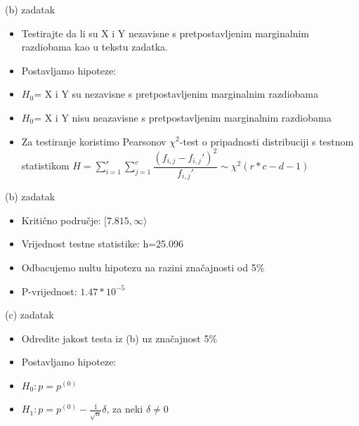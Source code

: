 \documentclass{beamer}
\begin{document}
\begin{frame}{(b) zadatak}
\begin{itemize}
\item Testirajte da li su X i Y nezavisne s pretpostavljenim marginalnim razdiobama kao u
tekstu zadatka.
\item Postavljamo hipoteze:\\
\item $ H_{0} $= X i Y su nezavisne s pretpostavljenim marginalnim razdiobama\\
\item $ H_{0} $= X i Y nisu neazavisne s pretpostavljenim marginalnim razdiobama\\
\item Za testiranje koristimo Pearsonov $\chi^2$-test o pripadnosti distribuciji s testnom statistikom 
$H=\sum_{i=1}^{r} \sum_{j=1}^{c} \dfrac{(f_{i,j}-f_{i,j}')^2}{f_{i,j}'} \sim \chi^2(r*c-d-1)$
\end{itemize}
\end{frame}

\begin{frame}{(b) zadatak}
\begin{itemize}
\item Kritično područje: $[7.815,\infty\rangle$
\item Vrijednost testne statistike: h=25.096 
\item Odbacujemo nultu hipotezu na razini značajnosti od 5\% 
\item P-vrijednost: $1.47*10^{-5}$ 
\end{itemize}
\end{frame}

\begin{frame}{(c) zadatak}
\begin{itemize}
\item Odredite jakost testa iz (b) uz značajnost 5\%
\item Postavljamo hipoteze:\\
\item $H_{0}: p=p^{(0)}$\\
\item $H_{1}: p=p^{(0)} - \frac{1}{\sqrt{n}} \delta$, za neki $\delta\neq 0$\\
\end{itemize}
\end{frame}
\end{document}
